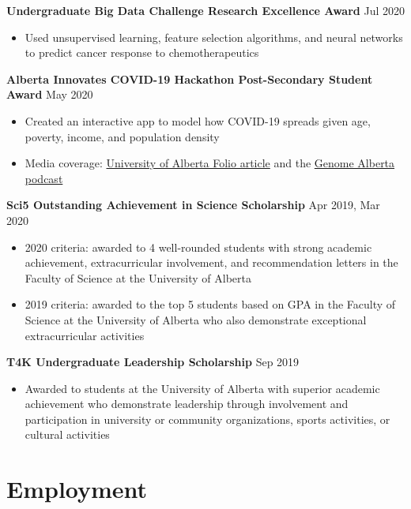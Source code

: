 \documentclass{article}
\begin{document}
\textbf{Undergraduate Big Data Challenge Research Excellence Award} \hfill Jul 2020
\begin{itemize}
    \item Used unsupervised learning, feature selection algorithms, and neural networks to predict cancer response to chemotherapeutics
\end{itemize} \vspace{1em}

\textbf{Alberta Innovates COVID-19 Hackathon Post-Secondary Student Award} \hfill May 2020
\begin{itemize}
    \item Created an interactive app to model how COVID-19 spreads given age, poverty, income, and population density
    \item Media coverage: \href{https://www.folio.ca/students-develop-online-tool-to-predict-covid-19-spread-based-on-demographics/}{University of Alberta Folio article} and the \href{https://genomealberta.ca/genomics/genomics_blog_08182001.aspx}{Genome Alberta podcast}
\end{itemize} \vspace{1em}

\textbf{Sci5 Outstanding Achievement in Science Scholarship} \hfill Apr 2019, Mar 2020
\begin{itemize}
    \item 2020 criteria: awarded to 4 well-rounded students with strong academic achievement, extracurricular involvement, and recommendation letters in the Faculty of Science at the University of Alberta
    \item 2019 criteria: awarded to the top 5 students based on GPA in the Faculty of Science at the University of Alberta who also demonstrate exceptional extracurricular activities
\end{itemize} \vspace{1em}

\textbf{T4K Undergraduate Leadership Scholarship} \hfill Sep 2019
\begin{itemize}
    \item Awarded to students at the University of Alberta with superior academic achievement who demonstrate leadership through involvement and participation in university or community organizations, sports activities, or cultural activities
\end{itemize}


\section*{\textcolor{my_colour}{Employment}}
\vspace{-.25em} \hrulefill \vspace{.25em}
\end{document}
